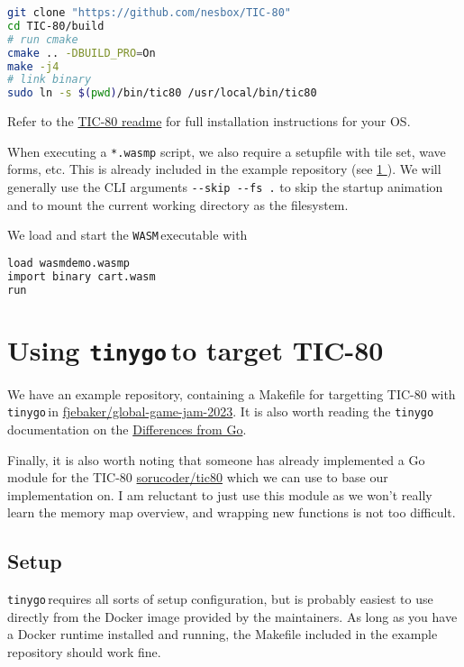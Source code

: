 \documentclass{article}
\newcommand{\tinygo}{\texttt{tinygo}\,}
\newcommand{\WASM}{\texttt{WASM}\,}
\newcommand{\fullref}[1]{\hyperref[{#1}]{\ref{#1} \nameref{#1}}}
\begin{document}
\begin{lstlisting}[language=Bash]
git clone "https://github.com/nesbox/TIC-80" 
cd TIC-80/build
# run cmake
cmake .. -DBUILD_PRO=On
make -j4
# link binary
sudo ln -s $(pwd)/bin/tic80 /usr/local/bin/tic80
\end{lstlisting}

\noindent Refer to the \href{https://github.com/nesbox/TIC-80}{TIC-80 readme} for full installation instructions for your OS.

When executing a \lstinline|*.wasmp| script, we also require a setupfile with tile set, wave forms, etc. This is already included in the example repository (see \fullref{sec:tinygo-tic80}). We will generally use the CLI arguments \lstinline|--skip --fs .| to skip the startup animation and to mount the current working directory as the filesystem. 

We load and start the \WASM executable with\\

\begin{lstlisting}[language=Bash]
load wasmdemo.wasmp 
import binary cart.wasm 
run
\end{lstlisting}

\section{Using \tinygo to target TIC-80}\label{sec:tinygo-tic80}

We have an example repository, containing a Makefile for targetting TIC-80 with \tinygo in \href{https://github.com/fjebaker/global-game-jam-2023}{fjebaker/global-game-jam-2023}. It is also worth reading the \tinygo documentation on the \href{https://tinygo.org/docs/concepts/compiler-internals/differences-from-go/}{Differences from Go}. 

Finally, it is also worth noting that someone has already implemented a Go module for the TIC-80 \href{https://github.com/sorucoder/tic80/blob/master/tic80.go}{sorucoder/tic80} which we can use to base our implementation on. I am reluctant to just use this module as we won't really learn the memory map overview, and wrapping new functions is not too difficult.


\subsection{Setup}

\tinygo requires all sorts of setup configuration, but is probably easiest to use directly from the Docker image provided by the maintainers. As long as you have a Docker runtime installed and running, the Makefile included in the example repository should work fine.
\end{document}

